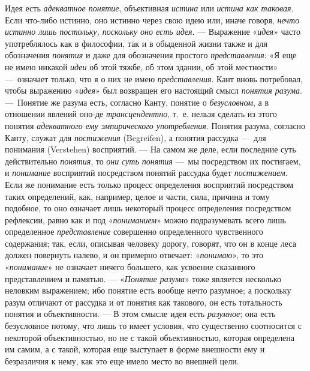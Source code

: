 \documentclass[twoside]{article}
\begin{document}
{{{{Идея есть {\em адекватное понятие}, объективная
{\em истина} или
{\em истина как таковая}.
Если что-либо истинно, оно истинно через свою идею или, иначе
говоря, {\em нечто истинно лишь
постольку, поскольку оно есть идея}. — Выражение
«{\em идея}» часто
употреблялось как в философии, так и в обыденной жизни также и для
обозначения {\em понятия}
и даже для обозначения простого
{\em представления}: «Я
еще не имею никакой {\em идеи}
об этой тяжбе, об этом здании, об этой местности»
—~означает только, что я о них не имею
{\em представления}. Кант
вновь потребовал, чтобы выражению
«{\em идея}» был
возвращен его настоящий смысл
{\em понятия разума}. 
—~Понятие же разума есть, согласно Канту, понятие о
{\em безусловном}, а в
отношении явлений оно-де
{\em трансцендентно},
т.~е. нельзя сделать из этого понятия
{\em адекватного ему эмпирического
употребления}. Понятия разума, согласно Канту, служат для
{\em постижения} (Begreifen),
а понятия рассудка —~для понимания (Verstehen)
восприятий. — На самом же деле, если последние суть
действительно {\em понятия},
то {\em они}
{\em суть понятия} —~мы
посредством их постигаем, и
{\em понимание}
восприятий посредством понятий рассудка будет
{\em постижением}. Если
же понимание есть только процесс определения восприятий посредством таких
определений, как, например, целое и части, сила, причина и тому подобное,
то оно означает лишь некоторый процесс определения посредством рефлексии,
равно как и под «{\em пониманием}»
можно подразумевать всего лишь определенное
{\em представление}
совершенно определенного чувственного содержания; так, если,
описывая человеку дорогу, говорят, что он в конце леса должен повернуть
налево, и он примерно отвечает:
«{\em понимаю}», то это
«{\em понимание}» не
означает ничего большего, как усвоение сказанного представлением и
памятью. — «{\em Понятие разума}»
тоже является несколько неловким выражением; ибо понятие есть
вообще нечто разумное; а поскольку разум отличают от рассудка и от понятия
как такового, он есть тотальность понятия и объективности. —
В этом смысле идея есть
{\em разумное}; она есть
безусловное потому, что лишь то имеет условия, что существенно соотносится
с некоторой объективностью, но не с такой объективностью, которая
определена им самим, а с такой, которая еще выступает в форме внешности ему
и безразличия к нему, как это еще имело место во внешней цели.

}}}}
\end{document}
